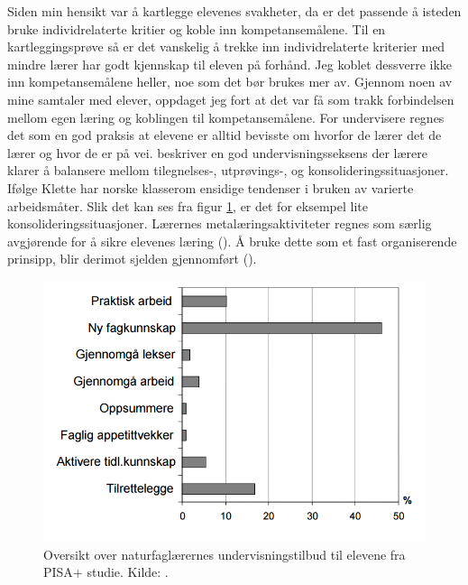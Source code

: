 \documentclass[main.tex]{subfiles}
\begin{document}
Siden min hensikt var å kartlegge elevenes svakheter, da er det passende å isteden bruke individrelaterte kritier 
og koble inn kompetansemålene. Til en kartleggingsprøve så er det vanskelig å trekke inn individrelaterte kriterier
med mindre lærer har godt kjennskap til eleven på forhånd. Jeg koblet dessverre ikke inn kompetansemålene heller, 
noe som det bør brukes mer av. Gjennom noen av mine samtaler med elever, oppdaget jeg fort at det var få som trakk 
forbindelsen mellom egen læring og koblingen til kompetansemålene. For undervisere regnes det som en god praksis at 
elevene er alltid bevisste om hvorfor de lærer det de lærer og hvor de er på vei.  beskriver 
en god undervisningsseksens der lærere klarer å balansere mellom tilegnelses-, utprøvings-, og 
konsolideringssituasjoner. Ifølge Klette har norske klasserom ensidige tendenser i bruken av varierte arbeidsmåter. 
Slik det kan ses fra figur \ref{fig:odeg10}, er det for eksempel lite konsolideringssituasjoner. Lærernes 
metalæringsaktiviteter regnes som særlig avgjørende for å sikre elevenes læring (). Å bruke 
dette som et fast organiserende prinsipp, blir derimot sjelden gjennomført ().
\begin{figure}[h!]
\includegraphics[scale = 0.6]{../figures/undervisnings_aktivitet.png}
\caption{Oversikt over naturfaglærernes undervisningstilbud til elevene fra PISA+ studie. Kilde: 
\protect{}.}
\label{fig:odeg10}
\end{figure}
\end{document}
